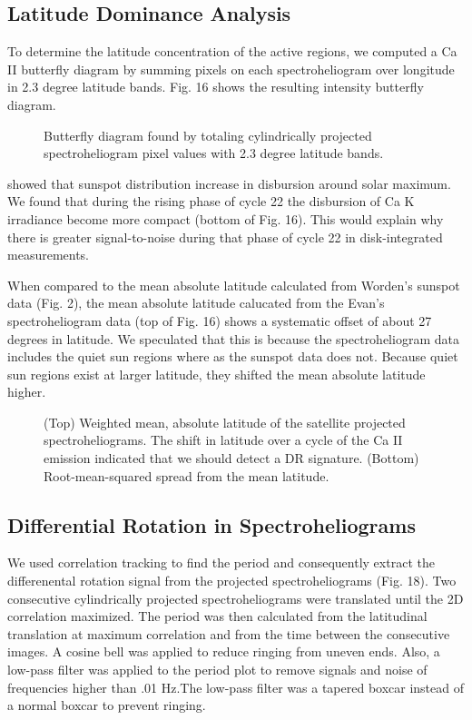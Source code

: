 \documentclass[preprint2]{aastex}
\begin{document}
\subsection{Latitude Dominance Analysis}

To determine the latitude concentration of the active regions, we computed a Ca II butterfly diagram by summing pixels on each spectroheliogram over longitude in 2.3 degree latitude bands. Fig. 16 shows the resulting intensity butterfly diagram.

\begin{figure}[H]
\caption{Butterfly diagram found by totaling cylindrically projected spectroheliogram pixel values with 2.3 degree latitude bands. }
\end{figure}

\cite{hath10} showed that sunspot distribution increase in disbursion around solar maximum. We found that during the rising phase of cycle 22 the disbursion of Ca K irradiance become more compact (bottom of Fig. 16). This would explain why there is greater signal-to-noise during that phase of cycle 22 in disk-integrated measurements.

When compared to the mean absolute latitude calculated from Worden's sunspot data (Fig. 2), the mean absolute latitude calucated from the Evan's spectroheliogram data (top of Fig. 16) shows a systematic offset of about 27 degrees in latitude. We speculated that this is because the spectroheliogram data includes the quiet sun regions where as the sunspot data does not. Because quiet sun regions exist at larger latitude, they shifted the mean absolute latitude higher.

\begin{figure}[H]
\caption{(Top) Weighted mean, absolute latitude of the satellite projected spectroheliograms. The shift in latitude over a cycle of the Ca II emission indicated that we should detect a DR signature. (Bottom) Root-mean-squared spread from the mean latitude. }
\end{figure}

\subsection{Differential Rotation in Spectroheliograms}

We used correlation tracking to find the period and consequently extract the differenental rotation signal from the projected spectroheliograms (Fig. 18). Two consecutive cylindrically projected spectroheliograms were translated until the 2D correlation maximized. The period was then calculated from the latitudinal translation at maximum correlation and from the time between the consecutive images. A cosine bell was applied to reduce ringing from uneven ends. Also, a low-pass filter was applied to the period plot to remove signals and noise of frequencies higher than .01 Hz.The low-pass filter was a tapered boxcar instead of a normal boxcar to prevent ringing.
\end{document}
